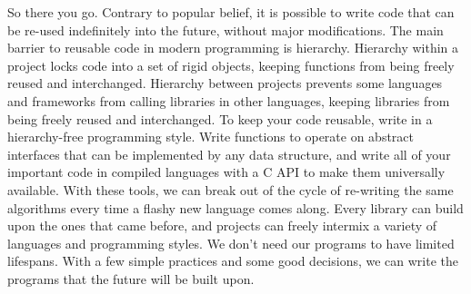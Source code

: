 \documentclass[12pt]{article}
\begin{document}
So there you go. Contrary to popular belief, it is possible to write code that
can be re-used indefinitely into the future, without major modifications. The
main barrier to reusable code in modern programming is hierarchy. Hierarchy
within a project locks code into a set of rigid objects, keeping functions from
being freely reused and interchanged. Hierarchy between projects prevents some
languages and frameworks from calling libraries in other languages, keeping
libraries from being freely reused and interchanged. To keep your code
reusable, write in a hierarchy-free programming style.  Write functions to
operate on abstract interfaces that can be implemented by any data structure,
and write all of your important code in compiled languages with a C API to make
them universally available. With these tools, we can break out of the cycle of
re-writing the same algorithms every time a flashy new language comes along.
Every library can build upon the ones that came before, and projects can freely
intermix a variety of languages and programming styles. We don't need our programs
to have limited lifespans. With a few simple practices and some good decisions,
we can write the programs that the future will be built upon.


\end{document}
